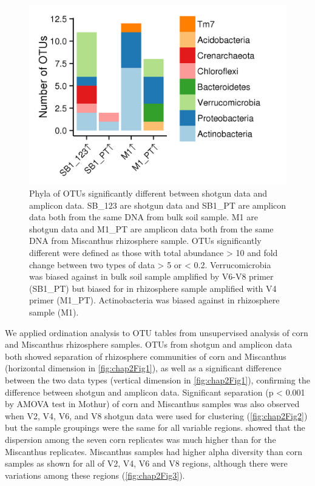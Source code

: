 \documentclass[]{msu-thesis}
\begin{document}
\begin{figure}[tbph!]
  \centering
  \includegraphics[scale=1]{figs/chap2_figS5}
  \caption[Phyla of OTUs significantly different between shotgun data and amplicon data]{Phyla of OTUs significantly different between shotgun data and amplicon data. SB\_123 are shotgun data and SB1\_PT are amplicon data both from the same DNA from bulk soil sample. M1 are shotgun data and M1\_PT are amplicon data both from the same DNA from Miscanthus rhizosphere sample. OTUs significantly different were defined as those with total abundance > 10 and fold change between two types of data > 5 or < 0.2. Verrucomicrobia was biased against in bulk soil sample amplified by V6-V8 primer (SB1\_PT) but biased for in rhizosphere sample amplified with V4 primer (M1\_PT). Actinobacteria was biased against in rhizosphere sample (M1).}
  \label{fig:chap2FigS5}
\end{figure}


We applied ordination analysis to OTU tables from unsupervised analysis of corn and Miscanthus rhizosphere samples. OTUs from shotgun and amplicon data both showed separation of rhizosphere communities of corn and Miscanthus (horizontal dimension in \cref{fig:chap2Fig1}), as well as a significant difference between the two data types (vertical dimension in \cref{fig:chap2Fig1}), confirming the difference between shotgun and amplicon data. Significant separation (p < 0.001 by AMOVA test in Mothur) of corn and Miscanthus samples was also observed when V2, V4, V6, and V8 shotgun data were used for clustering (\cref{fig:chap2Fig2}) but the sample groupings were the same for all variable regions.  showed that the dispersion among the seven corn replicates was much higher than for the Miscanthus replicates. Miscanthus samples had higher alpha diversity than corn samples as shown for all of V2, V4, V6 and V8 regions, although there were variations among these regions (\cref{fig:chap2Fig3}).
\end{document}
